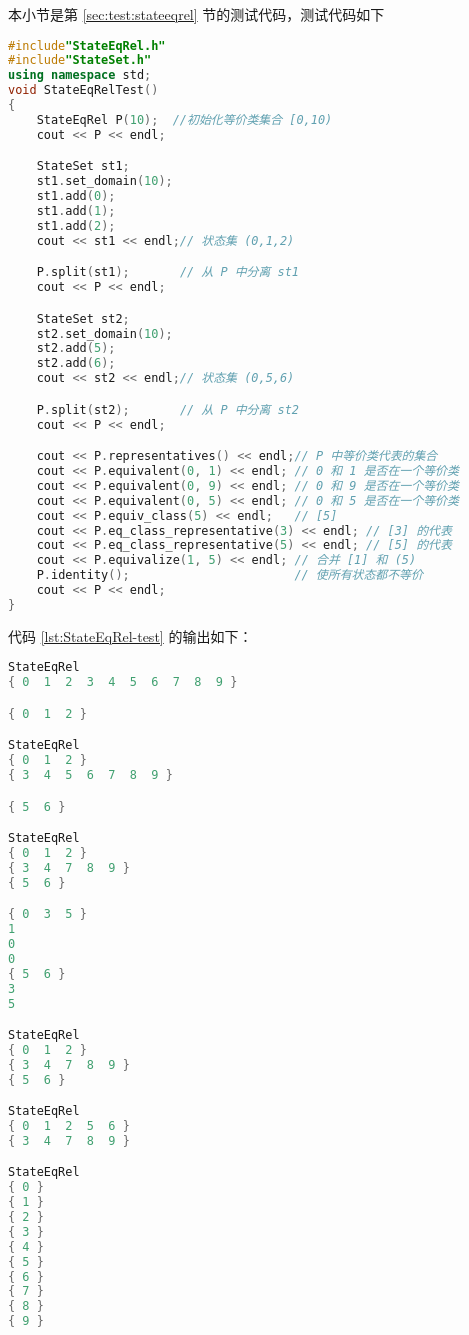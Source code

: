 本小节是第 \ref{sec:test:stateeqrel} 节的测试代码，测试代码如下
\begin{lstlisting}[language=C++,label={lst:StateEqRel-test},caption={类 StateEqRel 的测试代码}]
#include"StateEqRel.h"
#include"StateSet.h"
using namespace std;
void StateEqRelTest()
{
    StateEqRel P(10);  //初始化等价类集合 [0,10) 
    cout << P << endl;

    StateSet st1;
    st1.set_domain(10);
    st1.add(0);
    st1.add(1);
    st1.add(2);         
    cout << st1 << endl;// 状态集 (0,1,2)

    P.split(st1);       // 从 P 中分离 st1
    cout << P << endl;

    StateSet st2;
    st2.set_domain(10);
    st2.add(5);
    st2.add(6);
    cout << st2 << endl;// 状态集 (0,5,6)

    P.split(st2);       // 从 P 中分离 st2
    cout << P << endl;

    cout << P.representatives() << endl;// P 中等价类代表的集合
    cout << P.equivalent(0, 1) << endl; // 0 和 1 是否在一个等价类
    cout << P.equivalent(0, 9) << endl; // 0 和 9 是否在一个等价类
    cout << P.equivalent(0, 5) << endl; // 0 和 5 是否在一个等价类
    cout << P.equiv_class(5) << endl;   // [5]
    cout << P.eq_class_representative(3) << endl; // [3] 的代表
    cout << P.eq_class_representative(5) << endl; // [5] 的代表
    cout << P.equivalize(1, 5) << endl; // 合并 [1] 和 (5)
    P.identity();                       // 使所有状态都不等价
    cout << P << endl;                  
}
\end{lstlisting}

代码 \ref{lst:StateEqRel-test} 的输出如下：

\begin{lstlisting}[language=C++,label={lst:StateEqRel-test-result},caption={代码 \ref{lst:StateEqRel-test} 的输出}]
StateEqRel
{ 0  1  2  3  4  5  6  7  8  9 }

{ 0  1  2 }

StateEqRel
{ 0  1  2 }
{ 3  4  5  6  7  8  9 }

{ 5  6 }

StateEqRel
{ 0  1  2 }
{ 3  4  7  8  9 }
{ 5  6 }

{ 0  3  5 }
1
0
0
{ 5  6 }
3
5

StateEqRel
{ 0  1  2 }
{ 3  4  7  8  9 }
{ 5  6 }

StateEqRel
{ 0  1  2  5  6 }
{ 3  4  7  8  9 }

StateEqRel
{ 0 }
{ 1 }
{ 2 }
{ 3 }
{ 4 }
{ 5 }
{ 6 }
{ 7 }
{ 8 }
{ 9 }
\end{lstlisting}

